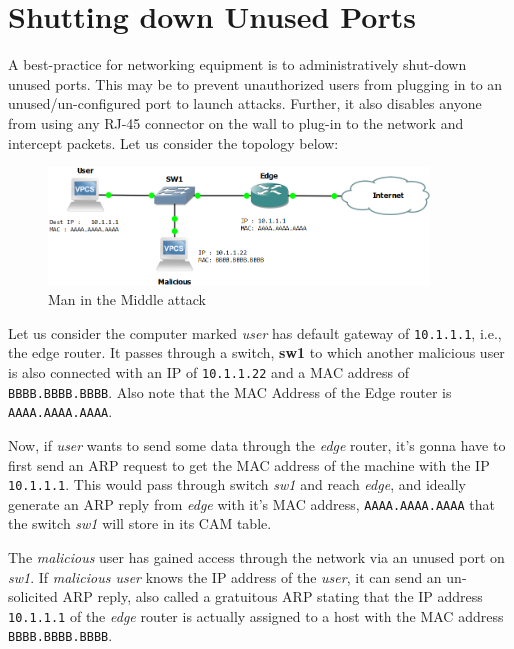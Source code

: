 \section{Shutting down Unused Ports}
A best-practice for networking equipment is to administratively shut-down unused ports. This may be to prevent unauthorized users from plugging in to an unused/un-configured port to launch attacks. Further, it also disables anyone from using any RJ-45 connector on the wall to plug-in to the network and intercept packets. Let us consider the topology below:

\begin{figure}[H]
\centering
\includegraphics[width=0.9\textwidth]{"ICND1/1. Switches/chapters/5.3.a Man in the middle"}
\caption{Man in the Middle attack}
\label{fig:5.3.a}
\end{figure}
\vspace{-10pt}

\noindent
Let us consider the computer marked \textit{user} has  default gateway of \verb|10.1.1.1|, i.e., the edge router. It passes through a switch, \textbf{sw1} to which another malicious user is also connected with an IP of \verb|10.1.1.22| and a MAC address of \verb|BBBB.BBBB.BBBB|. Also note that the MAC Address of the Edge router is \verb|AAAA.AAAA.AAAA|. 

Now, if \textit{user} wants to send some data through the \textit{edge} router, it's gonna have to first send an ARP request to get the MAC address of the machine with the IP \verb|10.1.1.1|. This would pass through switch \textit{sw1} and reach \textit{edge}, and ideally generate an ARP reply from \textit{edge} with it's MAC address, \verb|AAAA.AAAA.AAAA| that the switch \textit{sw1} will store in its CAM table. 

The \textit{malicious} user has gained access through the network via an unused port on \textit{sw1}. If \textit{malicious user} knows the IP address of the \textit{user}, it can send an un-solicited ARP reply, also called a gratuitous ARP stating that the IP address \verb|10.1.1.1| of the \textit{edge} router is actually assigned to a host with the MAC address \verb|BBBB.BBBB.BBBB|. 


